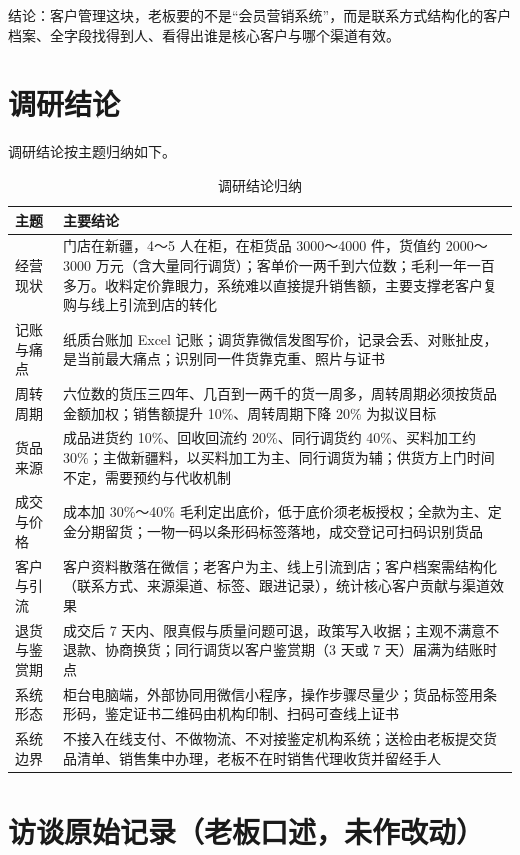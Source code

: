 \documentclass[12pt, a4paper]{ctexart}
\begin{document}
结论：客户管理这块，老板要的不是“会员营销系统”，而是联系方式结构化的客户档案、全字段找得到人、看得出谁是核心客户与哪个渠道有效。

\section{调研结论}

调研结论按主题归纳如下。

\begin{table}[H]
\centering
\small
\caption{调研结论归纳}
\begin{tabularx}{\textwidth}{@{}p{2.6cm} X@{}}
\toprule
主题 & 主要结论 \\
\midrule
经营现状 & 门店在新疆，4～5 人在柜，在柜货品 3000～4000 件，货值约 2000～3000 万元（含大量同行调货）；客单价一两千到六位数；毛利一年一百多万。收料定价靠眼力，系统难以直接提升销售额，主要支撑老客户复购与线上引流到店的转化 \\
记账与痛点 & 纸质台账加 Excel 记账；调货靠微信发图写价，记录会丢、对账扯皮，是当前最大痛点；识别同一件货靠克重、照片与证书 \\
周转周期 & 六位数的货压三四年、几百到一两千的货一周多，周转周期必须按货品金额加权；销售额提升 10\%、周转周期下降 20\% 为拟议目标 \\
货品来源 & 成品进货约 10\%、回收回流约 20\%、同行调货约 40\%、买料加工约 30\%；主做新疆料，以买料加工为主、同行调货为辅；供货方上门时间不定，需要预约与代收机制 \\
成交与价格 & 成本加 30\%～40\% 毛利定出底价，低于底价须老板授权；全款为主、定金分期留货；一物一码以条形码标签落地，成交登记可扫码识别货品 \\
客户与引流 & 客户资料散落在微信；老客户为主、线上引流到店；客户档案需结构化（联系方式、来源渠道、标签、跟进记录），统计核心客户贡献与渠道效果 \\
退货与鉴赏期 & 成交后 7 天内、限真假与质量问题可退，政策写入收据；主观不满意不退款、协商换货；同行调货以客户鉴赏期（3 天或 7 天）届满为结账时点 \\
系统形态 & 柜台电脑端，外部协同用微信小程序，操作步骤尽量少；货品标签用条形码，鉴定证书二维码由机构印制、扫码可查线上证书 \\
系统边界 & 不接入在线支付、不做物流、不对接鉴定机构系统；送检由老板提交货品清单、销售集中办理，老板不在时销售代理收货并留经手人 \\
\bottomrule
\end{tabularx}
\end{table}

\newpage
\appendix
\section{访谈原始记录（老板口述，未作改动）}
\end{document}
